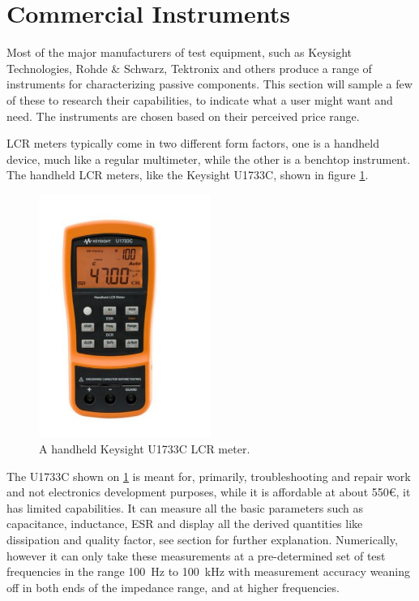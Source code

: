 \section{Commercial Instruments} \label{sec:CommercialImpedanceMeasurement}
Most of the major manufacturers of test equipment, such as Keysight Technologies, Rohde \& Schwarz, Tektronix and others produce a range of instruments for characterizing passive components. This section will sample a few of these to research their capabilities, to indicate what a user might want and need. The instruments are chosen based on their perceived price range. 

LCR meters typically come in two different form factors, one is a handheld device, much like a regular multimeter, while the other is a benchtop instrument. The handheld LCR meters, like the Keysight U1733C\cite{KeysightU1733C}, shown in figure \ref{fig:2_2_U1733C}.
\begin{figure}[H]
    \centering
    \includegraphics[clip, trim=0 50 0 50, width=0.5\textwidth]{Sections/2_ProblemAnalysis/FIgures/KeysightU1733C.pdf}
    \caption{A handheld Keysight U1733C LCR meter.\cite{KeysightU1733C}}
    \label{fig:2_2_U1733C}
\end{figure}
The U1733C shown on \ref{fig:2_2_U1733C} is meant for, primarily, troubleshooting and repair work and not electronics development purposes, while it is affordable at about 550€, it has limited capabilities. It can measure all the basic parameters such as capacitance, inductance, ESR and display all the derived quantities like dissipation and quality factor, see section  for further explanation. Numerically, however it can only take these measurements at a pre-determined set of test frequencies in the range \SI[]{100}{\hertz} to \SI[]{100}{\kilo\hertz} with measurement accuracy weaning off in both ends of the impedance range, and at higher frequencies.

